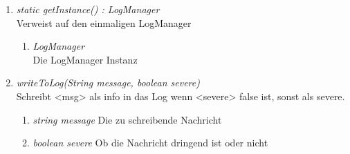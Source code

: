\begin{enumerate}[+]

	\item \textit{static getInstance() : LogManager}  \\ Verweist auf den einmaligen LogManager
	
	\vspace{-0.2cm}
	\begin{enumerate}[$\circ$]
		\item \textit{LogManager} \\ Die LogManager Instanz
	\end{enumerate}

\item \textit{writeToLog(String message, boolean severe)} \\ Schreibt <msg> als info in das Log wenn <severe> false ist,
sonst als severe.
\begin{enumerate}[$\bullet$]
\item \textit{string message} Die zu schreibende Nachricht
\item \textit{boolean severe} Ob die Nachricht dringend ist oder nicht
\end{enumerate}
\end{enumerate}


	